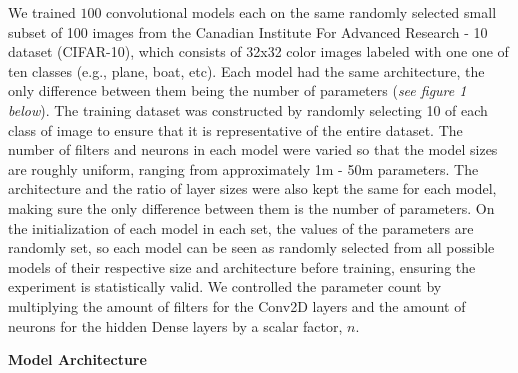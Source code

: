 \documentclass[12pt]{article}
\begin{document}
    We trained $100$ convolutional models each on the same randomly selected small subset of 100 images
    from the Canadian Institute For Advanced Research - 10 dataset (CIFAR-10), which consists of 32x32 color images labeled with one one of ten classes (e.g., plane, boat, etc).
    Each model had the same architecture, the only difference between them being the number of parameters (\textit{see figure 1 below}).
    The training dataset was constructed by randomly selecting 10 of each class of image to ensure that it is representative of the entire dataset.
    The number of filters and neurons in each model were varied so that the model sizes are roughly uniform, ranging from approximately 1m - 50m parameters.
    The architecture and the ratio of layer sizes were also kept the same for each model, making sure the only difference between them is the number of parameters.
    On the initialization of each model in each set, the values of the parameters are randomly set, so each model can be seen as randomly
    selected from all possible models of their respective size and architecture before training, ensuring the experiment is statistically valid.
    We controlled the parameter count by multiplying the amount of filters for the Conv2D layers and the amount of neurons
    for the hidden Dense layers by a scalar factor, $n$.

    \noindent\textbf{Model Architecture}
    \begin{center}
    \end{center}
\end{document}
